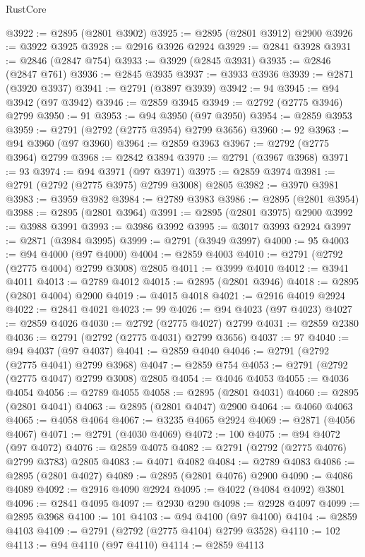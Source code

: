 \begin{lexlean}{RustCore}
\begin{coremodule}
@3922 := @2895 (@2801 @3902)
@3925 := @2895 (@2801 @3912) @2900
@3926 := @3922 @3925
@3928 := @2916 @3926 @2924
@3929 := @2841 @3928
@3931 := @2846 (@2847 @754)
@3933 := @3929 (@2845 @3931)
@3935 := @2846 (@2847 @761)
@3936 := @2845 @3935
@3937 := @3933 @3936
@3939 := @2871 (@3920 @3937)
@3941 := @2791 (@3897 @3939)
@3942 := 94
@3945 := @94 @3942 (@97 @3942)
@3946 := @2859 @3945
@3949 := @2792 (@2775 @3946) @2799
@3950 := 91
@3953 := @94 @3950 (@97 @3950)
@3954 := @2859 @3953
@3959 := @2791 (@2792 (@2775 @3954) @2799 @3656)
@3960 := 92
@3963 := @94 @3960 (@97 @3960)
@3964 := @2859 @3963
@3967 := @2792 (@2775 @3964) @2799
@3968 := @2842 @3894
@3970 := @2791 (@3967 @3968)
@3971 := 93
@3974 := @94 @3971 (@97 @3971)
@3975 := @2859 @3974
@3981 := @2791 (@2792 (@2775 @3975) @2799 @3008) @2805
@3982 := @3970 @3981
@3983 := @3959 @3982
@3984 := @2789 @3983
@3986 := @2895 (@2801 @3954)
@3988 := @2895 (@2801 @3964)
@3991 := @2895 (@2801 @3975) @2900
@3992 := @3988 @3991
@3993 := @3986 @3992
@3995 := @3017 @3993 @2924
@3997 := @2871 (@3984 @3995)
@3999 := @2791 (@3949 @3997)
@4000 := 95
@4003 := @94 @4000 (@97 @4000)
@4004 := @2859 @4003
@4010 := @2791 (@2792 (@2775 @4004) @2799 @3008) @2805
@4011 := @3999 @4010
@4012 := @3941 @4011
@4013 := @2789 @4012
@4015 := @2895 (@2801 @3946)
@4018 := @2895 (@2801 @4004) @2900
@4019 := @4015 @4018
@4021 := @2916 @4019 @2924
@4022 := @2841 @4021
@4023 := 99
@4026 := @94 @4023 (@97 @4023)
@4027 := @2859 @4026
@4030 := @2792 (@2775 @4027) @2799
@4031 := @2859 @2380
@4036 := @2791 (@2792 (@2775 @4031) @2799 @3656)
@4037 := 97
@4040 := @94 @4037 (@97 @4037)
@4041 := @2859 @4040
@4046 := @2791 (@2792 (@2775 @4041) @2799 @3968)
@4047 := @2859 @754
@4053 := @2791 (@2792 (@2775 @4047) @2799 @3008) @2805
@4054 := @4046 @4053
@4055 := @4036 @4054
@4056 := @2789 @4055
@4058 := @2895 (@2801 @4031)
@4060 := @2895 (@2801 @4041)
@4063 := @2895 (@2801 @4047) @2900
@4064 := @4060 @4063
@4065 := @4058 @4064
@4067 := @3235 @4065 @2924
@4069 := @2871 (@4056 @4067)
@4071 := @2791 (@4030 @4069)
@4072 := 100
@4075 := @94 @4072 (@97 @4072)
@4076 := @2859 @4075
@4082 := @2791 (@2792 (@2775 @4076) @2799 @3783) @2805
@4083 := @4071 @4082
@4084 := @2789 @4083
@4086 := @2895 (@2801 @4027)
@4089 := @2895 (@2801 @4076) @2900
@4090 := @4086 @4089
@4092 := @2916 @4090 @2924
@4095 := @4022 (@4084 @4092) @3801
@4096 := @2841 @4095
@4097 := @2930 @290
@4098 := @2928 @4097
@4099 := @2895 @3968
@4100 := 101
@4103 := @94 @4100 (@97 @4100)
@4104 := @2859 @4103
@4109 := @2791 (@2792 (@2775 @4104) @2799 @3528)
@4110 := 102
@4113 := @94 @4110 (@97 @4110)
@4114 := @2859 @4113

\end{coremodule}
\end{lexlean}
